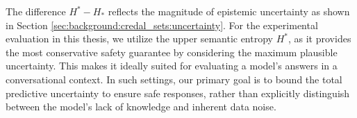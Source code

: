 The difference $H^* - H_*$ reflects the magnitude of epistemic 
uncertainty as shown in Section
\ref{sec:background:credal_sets:uncertainty}. 
For the experimental evaluation in this thesis, we utilize the 
upper semantic entropy $H^*$, as it provides the most conservative 
safety guarantee by considering the maximum plausible uncertainty.
This makes it ideally suited for evaluating a model's answers in a
conversational context. In such settings, our primary goal is to
bound the total predictive uncertainty to ensure safe responses,
rather than explicitly distinguish between the model's lack of
knowledge and inherent data noise.
